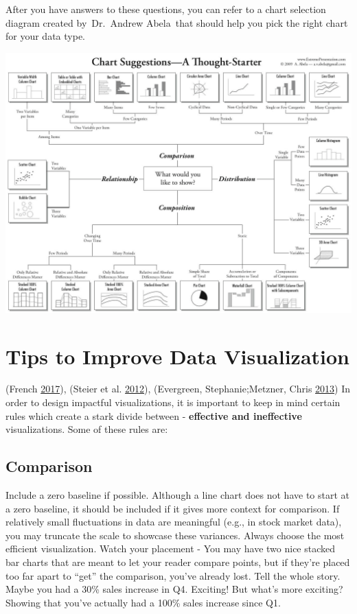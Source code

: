 \documentclass[]{book}
\begin{document}
After you have answers to these questions, you can refer to a chart selection diagram created by~Dr.~Andrew Abela~that should help you pick the right chart for your data type.

\includegraphics{images/Chart_Selection_Diagram.png}

\hypertarget{tips-to-improve-data-visualization}{%
\section{Tips to Improve Data Visualization}\label{tips-to-improve-data-visualization}}

(French \protect\hyperlink{ref-French}{2017}), (Steier et al. \protect\hyperlink{ref-Steier}{2012}), (Evergreen, Stephanie;Metzner, Chris \protect\hyperlink{ref-Steph}{2013})
In order to design impactful visualizations, it is important to keep in mind certain rules which create a stark divide between - \textbf{effective and ineffective} visualizations. Some of these rules are:

\hypertarget{comparison-1}{%
\subsection{Comparison}\label{comparison-1}}

Include a zero baseline if possible. Although a line chart does not have to start at a zero baseline, it should be included if it gives more context for comparison. If relatively small fluctuations in data are meaningful (e.g., in stock market data), you may truncate the scale to showcase these variances. Always choose the most efficient visualization. Watch your placement - You may have two nice stacked bar charts that are meant to let your reader compare points, but if they're placed too far apart to ``get'' the comparison, you've already lost. Tell the whole story. Maybe you had a 30\% sales increase in Q4. Exciting! But what's more exciting? Showing that you've actually had a 100\% sales increase since Q1.
\end{document}
